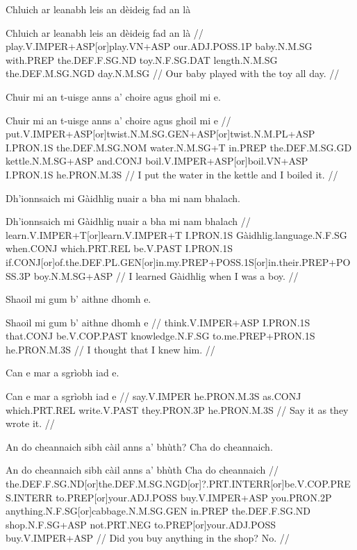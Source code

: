 \documentclass[a4paper,10pt]{article}
\begin{document}
\ex
\begingl
\glpre Chluich ar leanabh leis an dèideig fad an là 

\vspace{4mm}
\gla Chluich ar leanabh leis an dèideig fad an là  //
\glb play.V.IMPER+ASP[or]play.VN+ASP our.ADJ.POSS.1P baby.N.M.SG with.PREP the.DEF.F.SG.ND toy.N.F.SG.DAT length.N.M.SG the.DEF.M.SG.NGD day.N.M.SG  //
\glft Our baby played with the toy all day. //
\endgl
\xe

\ex
\begingl
\glpre Chuir mi an t-uisge anns a' choire agus ghoil mi e. 

\vspace{4mm}
\gla Chuir mi an t-uisge anns a' choire agus ghoil mi e  //
\glb put.V.IMPER+ASP[or]twist.N.M.SG.GEN+ASP[or]twist.N.M.PL+ASP I.PRON.1S the.DEF.M.SG.NOM water.N.M.SG+T in.PREP the.DEF.M.SG.GD kettle.N.M.SG+ASP and.CONJ boil.V.IMPER+ASP[or]boil.VN+ASP I.PRON.1S he.PRON.M.3S  //
\glft I put the water in the kettle and I boiled it. //
\endgl
\xe

\ex
\begingl
\glpre Dh'ionnsaich mi Gàidhlig nuair a bha mi nam bhalach. 

\vspace{4mm}
\gla Dh'ionnsaich mi Gàidhlig nuair a bha mi nam bhalach  //
\glb learn.V.IMPER+T[or]learn.V.IMPER+T I.PRON.1S Gàidhlig.language.N.F.SG when.CONJ which.PRT.REL be.V.PAST I.PRON.1S if.CONJ[or]of.the.DEF.PL.GEN[or]in.my.PREP+POSS.1S[or]in.their.PREP+POSS.3P boy.N.M.SG+ASP  //
\glft I learned Gàidhlig when I was a boy. //
\endgl
\xe

\ex
\begingl
\glpre Shaoil mi gum b' aithne dhomh e. 

\vspace{4mm}
\gla Shaoil mi gum b' aithne dhomh e  //
\glb think.V.IMPER+ASP I.PRON.1S that.CONJ be.V.COP.PAST knowledge.N.F.SG to.me.PREP+PRON.1S he.PRON.M.3S  //
\glft I thought that I knew him. //
\endgl
\xe

\ex
\begingl
\glpre Can e mar a sgrìobh iad e. 

\vspace{4mm}
\gla Can e mar a sgrìobh iad e  //
\glb say.V.IMPER he.PRON.M.3S as.CONJ which.PRT.REL write.V.PAST they.PRON.3P he.PRON.M.3S  //
\glft Say it as they wrote it. //
\endgl
\xe

\ex
\begingl
\glpre An do cheannaich sibh càil anns a' bhùth? Cha do cheannaich. 

\vspace{4mm}
\gla An do cheannaich sibh càil anns a' bhùth Cha do cheannaich  //
\glb the.DEF.F.SG.ND[or]the.DEF.M.SG.NGD[or]?.PRT.INTERR[or]be.V.COP.PRES.INTERR to.PREP[or]your.ADJ.POSS buy.V.IMPER+ASP you.PRON.2P anything.N.F.SG[or]cabbage.N.M.SG.GEN in.PREP the.DEF.F.SG.ND shop.N.F.SG+ASP not.PRT.NEG to.PREP[or]your.ADJ.POSS buy.V.IMPER+ASP  //
\glft Did you buy anything in the shop? No. //
\endgl
\xe
\end{document}

